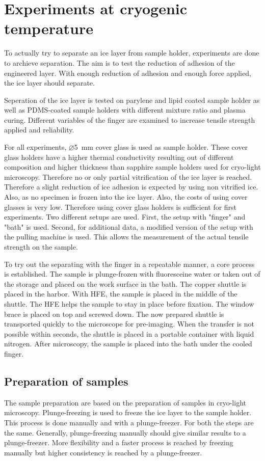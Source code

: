 \FloatBarrier

\section{Experiments at cryogenic temperature}

To actually try to separate an ice layer from sample holder, experiments are done to archieve separation. The aim is to test the reduction of adhesion of the engineered layer. With enough reduction of adhesion and enough force applied, the ice layer should separate.

Seperation of the ice layer is tested on parylene and lipid coated sample holder as well as PDMS-coated sample holders with different mixture ratio and plasma curing. Different variables of the finger are examined to increase tensile strength applied and reliability.

For all experiments, $\varnothing$\SI{5}{\milli\meter} cover glass is used as sample holder. These cover glass holders have a higher thermal conductivity resulting out of different composition and higher thickness than sapphire sample holders used for cryo-light microscopy. Therefore no or only partial vitrification of the ice layer is reached. Therefore a slight reduction of ice adhesion is expected by using non vitrified ice. Also, as no specimen is frozen into the ice layer. Also, the costs of using cover glasses is very low. Therefore using cover glass holders is sufficient for first experiments.
Two different setups are used. First, the setup with "finger" and "bath" is used. Second, for additional data, a modified version of the setup with the pulling machine is used. This allows the measurement of the actual tensile strength on the sample. 

To try out the separating with the finger in a repeatable manner, a core process is established. The sample is plunge-frozen with fluoresceine water or taken out of the storage and placed on the work surface in the bath. The copper shuttle is placed in the harbor. With HFE, the sample is placed in the middle of the shuttle. The HFE helps the sample to stay in place before fixation. The window brace is placed on top and screwed down. The now prepared shuttle is transported quickly to the microscope for pre-imaging. When the transfer is not possible within seconds, the shuttle is placed in a portable container with liquid nitrogen. After microscopy, the sample is placed into the bath under the cooled finger. 

\subsection{Preparation of samples}
The sample preparation are based on the preparation of samples in cryo-light microscopy. Plunge-freezing is used to freeze the ice layer to the sample holder. This process is done manually and with a plunge-freezer. For both the steps are the same. Generally, plunge-freezing manually should give similar results to a plunge-freezer. More flexibility and a faster process is reached by freezing manually but higher consistency is reached by a plunge-freezer.

